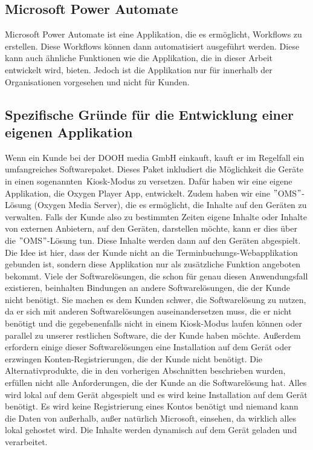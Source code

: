 \subsection{Microsoft Power Automate}\label{subsec:microsoft-power-automate}
Microsoft Power Automate ist eine Applikation, die es ermöglicht, Workflows zu erstellen.
Diese Workflows können dann automatisiert ausgeführt werden.
Diese kann auch ähnliche Funktionen wie die Applikation, die in dieser Arbeit entwickelt wird, bieten.
Jedoch ist die Applikation nur für innerhalb der Organisationen vorgesehen und nicht für Kunden.
\pagebreak
\subsection{Spezifische Gründe für die Entwicklung einer eigenen Applikation}\label{subsec:spezifische-grunde-fur-die-entwicklung-einer-eigenen-applikation}
Wenn ein Kunde bei der DOOH media GmbH einkauft, kauft er im Regelfall ein umfangreiches Softwarepaket.
Dieses Paket inkludiert die Möglichkeit die Geräte in einen sogenannten~\gls{Kiosk-Modus} zu versetzen.
Dafür haben wir eine eigene Applikation, die Oxygen Player App, entwickelt.
Zudem haben wir eine \("\)OMS\("\)-Lösung (Oxygen Media Server), die es ermöglicht, die Inhalte auf den Geräten zu verwalten.
Falls der Kunde also zu bestimmten Zeiten eigene Inhalte oder Inhalte von externen Anbietern, auf den Geräten, darstellen möchte, kann er dies über die \("\)OMS\("\)-Lösung tun.
Diese Inhalte werden dann auf den Geräten abgespielt.
\newline
Die Idee ist hier, dass der Kunde nicht an die Terminbuchungs-Webapplikation gebunden ist, sondern diese Applikation nur als zusätzliche Funktion angeboten bekommt.
Viele der Softwarelösungen, die schon für genau diesen Anwendungsfall existieren, beinhalten Bindungen an andere Softwarelösungen, die der Kunde nicht benötigt.
Sie machen es dem Kunden schwer, die Softwarelösung zu nutzen, da er sich mit anderen Softwarelösungen auseinandersetzen muss, die er nicht benötigt und die gegebenenfalls nicht in einem Kiosk-Modus laufen können oder parallel zu unserer restlichen Software, die der Kunde haben möchte.
Außerdem erfordern einige dieser Softwarelösungen eine Installation auf dem Gerät oder erzwingen Konten-Registrierungen, die der Kunde nicht benötigt.
\newline
Die Alternativprodukte, die in den vorherigen Abschnitten beschrieben wurden, erfüllen nicht alle Anforderungen, die der Kunde an die Softwarelösung hat.
Alles wird lokal auf dem Gerät abgespielt und es wird keine Installation auf dem Gerät benötigt.
Es wird keine Registrierung eines Kontos benötigt und niemand kann die Daten von außerhalb, außer natürlich Microsoft, einsehen, da wirklich alles lokal gehostet wird.
Die Inhalte werden dynamisch auf dem Gerät geladen und verarbeitet.
